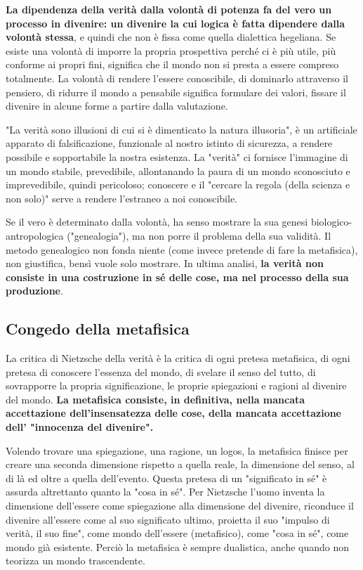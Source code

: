 \textbf{La dipendenza della verità dalla volontà di potenza fa del vero un processo in divenire: un divenire la cui logica è fatta dipendere dalla volontà stessa}, e quindi che non è fissa come quella dialettica hegeliana. Se esiste una volontà di imporre la propria prospettiva perché ci è più utile, più conforme ai propri fini, significa che il mondo non si presta  a essere compreso totalmente. La volontà di rendere l'essere conoscibile, di dominarlo attraverso il pensiero, di ridurre il mondo a pensabile significa formulare dei valori, fissare il divenire in alcune forme a partire dalla valutazione.

"La verità sono illusioni di cui si è dimenticato la natura illusoria", è un artificiale apparato di falsificazione, funzionale al nostro istinto di sicurezza, a rendere possibile e sopportabile la nostra esistenza. La "verità" ci fornisce l'immagine di un mondo stabile, prevedibile, allontanando la paura di un mondo sconosciuto e imprevedibile, quindi pericoloso; conoscere e il "cercare la regola (della scienza e non solo)" serve a rendere l'estraneo a noi conoscibile.

Se il vero è determinato dalla volontà, ha senso mostrare la sua genesi biologico-antropologica ("genealogia"), ma non porre il problema della sua validità. Il metodo genealogico non fonda niente (come invece pretende di fare la metafisica), non giustifica, bensì vuole solo mostrare. In ultima analisi, \textbf{la verità non consiste in una costruzione in sé delle cose, ma nel processo della sua produzione}.

\subsection{Congedo della metafisica}

La critica di Nietzsche della verità è la critica di ogni pretesa metafisica, di ogni pretesa di conoscere l'essenza del mondo, di svelare il senso del tutto, di sovrapporre la propria significazione, le proprie spiegazioni  e ragioni al divenire del mondo. \textbf{La metafisica consiste, in definitiva, nella mancata accettazione dell'insensatezza delle cose, della mancata accettazione dell' "innocenza del divenire".}

Volendo trovare una spiegazione, una ragione, un logos, la metafisica finisce per creare una seconda dimensione rispetto a quella reale, la dimensione del senso, al di là ed oltre a quella dell'evento. Questa pretesa di un "significato in sé" è assurda altrettanto quanto la "cosa in sé". Per Nietzsche l'uomo inventa la dimensione dell'essere come spiegazione alla dimensione del divenire, riconduce il divenire all'essere come al suo significato ultimo, proietta il suo "impulso di verità, il suo fine", come mondo dell'essere (metafisico), come "cosa in sé", come mondo già esistente. Perciò la metafisica è sempre dualistica, anche quando non teorizza un mondo trascendente.

